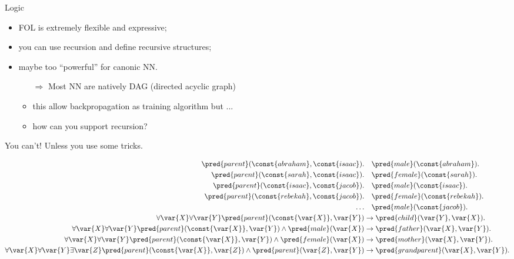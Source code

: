 \documentclass[presentation]{beamer}\mode<presentation>{\usetheme{AMSBolognaFC}}
\begin{document}
\begin{frame}[allowframebreaks]{Logic}
    \framebreak
    
    \begin{itemize}
        \item FOL is extremely flexible and expressive;
        \item you can use recursion and define recursive structures;
        \item maybe too ``powerful'' for canonic NN.
        \begin{itemize}
            \item[$\Rightarrow$] Most NN are natively DAG (directed acyclic graph)
            \item this allow backpropagation as training algorithm but ...
            \item how can you support recursion?  
        \end{itemize}
    \end{itemize}
    \centering
    You can't!
    Unless you use some tricks.
    
    \framebreak
    
    \begin{equation*}
        \begin{aligned}
            \pred{parent}(\const{abraham},\const{isaac}). &\phantom{\rightarrow} \pred{male}(\const{abraham}).\\
            \pred{parent}(\const{sarah},\const{isaac}). &\phantom{\rightarrow} \pred{female}(\const{sarah}).\\
            \pred{parent}(\const{isaac},\const{jacob}). &\phantom{\rightarrow} \pred{male}(\const{isaac}).\\
            \pred{parent}(\const{rebekah},\const{jacob}). &\phantom{\rightarrow} \pred{female}(\const{rebekah}).\\
            \dots &\phantom{\rightarrow} \pred{male}(\const{jacob}).\\
            \forall\var{X} \forall\var{Y} \pred{parent}(\const{\var{X}},\var{Y}) &\rightarrow \pred{child}(\var{Y},\var{X}).\\
            \forall\var{X} \forall\var{Y} \pred{parent}(\const{\var{X}},\var{Y}) \wedge \pred{male}(\var{X}) &\rightarrow \pred{father}(\var{X},\var{Y}).\\
            \forall\var{X} \forall\var{Y} \pred{parent}(\const{\var{X}},\var{Y}) \wedge \pred{female}(\var{X}) &\rightarrow \pred{mother}(\var{X},\var{Y}).\\
            \forall\var{X} \forall\var{Y} \exists\var{Z} \pred{parent}(\const{\var{X}},\var{Z}) \wedge \pred{parent}(\var{Z},\var{Y}) &\rightarrow \pred{grandparent}(\var{X},\var{Y}).\\
        \end{aligned}    
    \end{equation*}
    

\end{frame}
\end{document}
